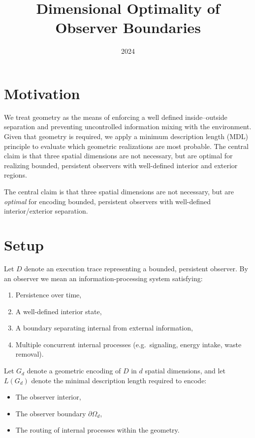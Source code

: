 \documentclass[11pt]{article}
\title{Dimensional Optimality of Observer Boundaries}
\date{2024}
\begin{document}
\maketitle

\section{Motivation}

We treat geometry as the means of enforcing a well defined inside–outside separation and preventing uncontrolled information mixing with the environment.
Given that geometry is required, we apply a minimum description length (MDL) principle to evaluate which geometric realizations are most probable.
The central claim is that three spatial dimensions are not necessary, but are optimal for realizing bounded, persistent observers with well-defined interior and exterior regions.

The central claim is that three spatial dimensions are not necessary, but are \emph{optimal} for encoding bounded, persistent observers with well-defined interior/exterior separation.

\section{Setup}

Let $D$ denote an execution trace representing a bounded, persistent observer. By an observer we mean an information-processing system satisfying:
\begin{enumerate}
    \item Persistence over time,
    \item A well-defined interior state,
    \item A boundary separating internal from external information,
    \item Multiple concurrent internal processes (e.g.\ signaling, energy intake, waste removal).
\end{enumerate}

Let $G_d$ denote a geometric encoding of $D$ in $d$ spatial dimensions, and let $L(G_d)$ denote the minimal description length required to encode:
\begin{itemize}
    \item The observer interior,
    \item The observer boundary $\partial \Omega_d$,
    \item The routing of internal processes within the geometry.
\end{itemize}
\end{document}
